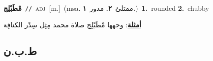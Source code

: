 \documentclass[10pt,a4paper,twoside]{article} %
\begin{document}
\begin{multicols}{2}
{\setlength\topsep{0pt}\textbf{\foreignlanguage{arabic}{مْطَبْلِج}}\ {\color{gray}\texttt{//}\color{black}}\ \textsc{adj}\ [m.]\ \color{gray}(msa. \foreignlanguage{arabic}{ممتلئ}~\foreignlanguage{arabic}{\textbf{٢.}}  \foreignlanguage{arabic}{مدور}~\foreignlanguage{arabic}{\textbf{١.}})\color{black}\ \textbf{1.}~rounded  \textbf{2.}~chubby\  \begin{flushright}\color{gray}\foreignlanguage{arabic}{\textbf{\underline{\foreignlanguage{arabic}{أمثلة}}}: وجهها مْطَبْلِج صلاة محمد مِثِل سِدْر الكنافِة}\end{flushright}\color{black}} \vspace{2mm}

\vspace{-3mm}
\subsection*{\color{blue}\foreignlanguage{arabic}{ط.ب.ن}\color{blue}{}} 


\end{multicols}
\end{document}
